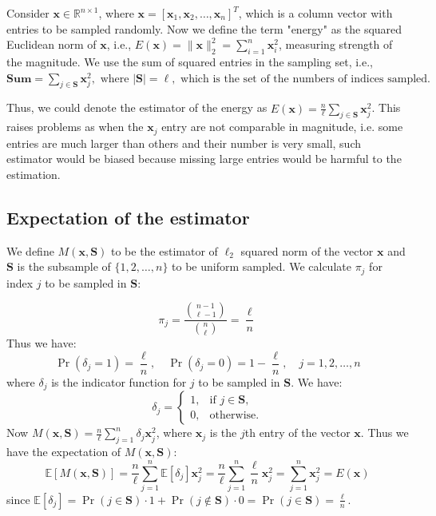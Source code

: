 \documentclass[11pt]{article}
\numberwithin{equation}{section}
\theoremstyle{plain}
\theoremstyle{definition}
\theoremstyle{remark}
\begin{document}
Consider $\mathbf{x} \in \mathbb{R}^{n \times 1}$, where $\mathbf{x} = [\mathbf{x}_1, \mathbf{x}_2, \ldots, \mathbf{x}_n]^T$, which is a column vector with entries to be sampled randomly.
Now we define the term "energy" as the squared Euclidean norm of $\mathbf{x}$, i.e., $E(\mathbf{x}) = \|\mathbf{x}\|_2^2 = \sum_{i=1}^n \mathbf{x}_i^2$, measuring strength of the magnitude. We use the sum of squared entries in the sampling set, i.e., $\mathbf{Sum} = \sum_{j \in \mathbf{S}} \mathbf{x}_j^2, \text{ where } |\mathbf{S}| = \ell, \text{ which is the set of the numbers of indices sampled.}$

Thus, we could denote the estimator of the energy as $\hat{E}(\mathbf{x}) = \frac{n}{\ell} \sum\limits_{j \in \mathbf{S}} \mathbf{x}_j^2$. This raises problems as when the $\mathbf{x}_j$ entry are not comparable in magnitude, i.e. some entries are much larger than others and their number is very small, such estimator would be biased because missing large entries would be harmful to the estimation. 



\subsection{Expectation of the estimator}

We define $M(\mathbf{x},\mathbf{S})$ to be the estimator of $\ell_2$ squared 
norm of the vector $\mathbf{x}$ and $\mathbf{S}$ is the subsample of $\{1,2,\ldots,n\}$ to be uniform sampled. 
We calculate $\pi_j$ for index $j$ to be sampled in $\mathbf{S}$:



\[
  \pi_j = \frac{\binom{n-1}{\ell-1}}{\binom{n}{\ell}} = \frac{\ell}{n}\tag{5.1}\label{eq:5.1}
\]
Thus we have:
\[
  \Pr(\delta_j = 1) = \frac{\ell}{n}, \quad \Pr(\delta_j = 0) = 1 - \frac{\ell}{n}, \quad j = 1, 2, \ldots, n\tag{5.2}\label{eq:5.2}
\]
where $\delta_j$ is the indicator function for $j$ to be sampled in $\mathbf{S}$.
We have:
\[
  \delta_j = \begin{cases}
  1, & \text{if } j \in \mathbf{S}, \\
  0, & \text{otherwise.}
  \end{cases}\tag{5.3}\label{eq:5.3}
\]
Now $M(\mathbf{x},\mathbf{S}) = \frac{n}{\ell} \sum_{j=1}^n \delta_j \mathbf{x}_j^2$, where $\mathbf{x}_j$ is the $j$th entry of the vector $\mathbf{x}$.
Thus we have the expectation of $M(\mathbf{x},\mathbf{S})$:
\[
  \mathbb{E}[M(\mathbf{x},\mathbf{S})] = \frac{n}{\ell} \sum_{j=1}^n \mathbb{E}[\delta_j] \mathbf{x}_j^2 = \frac{n}{\ell} \sum_{j=1}^n \frac{\ell}{n} \mathbf{x}_j^2 = \sum_{j=1}^n \mathbf{x}_j^2 = E(\mathbf{x})\tag{5.4}\label{5.4}
\]
since $\mathbb{E}[\delta_j] = \Pr(j \in \mathbf{S}) \cdot 1 + \Pr(j \notin \mathbf{S}) \cdot 0 = \Pr(j \in \mathbf{S}) = \frac{\ell}{n}.$
\end{document}
